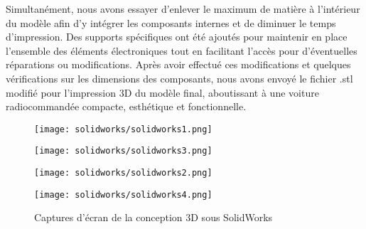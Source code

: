 Simultanément, nous avons essayer d'enlever le maximum de matière à l'intérieur du modèle afin d'y intégrer les composants internes et de diminuer le temps d'impression. Des supports spécifiques ont été ajoutés pour maintenir en place l'ensemble des éléments électroniques tout en facilitant l'accès pour d'éventuelles réparations ou modifications.
\newpage
Après avoir effectué ces modifications et quelques vérifications sur les dimensions des composants, nous avons envoyé le fichier .stl modifié pour l'impression 3D du modèle final, aboutissant à une voiture radiocommandée compacte, esthétique et fonctionnelle.
\bigbreak
\begin{figure}[h]
    \begin{minipage}[c]{.46\linewidth}
        \centering
        \texttt{[image: solidworks/solidworks1.png]}
    	\label{fig:Vue principale conception 3D}
    \end{minipage}
    \hfill%
    \begin{minipage}[c]{.46\linewidth}
        \centering
        \texttt{[image: solidworks/solidworks3.png]}
    	\label{fig:Vue de côté conception 3D}
    \end{minipage}
    \begin{minipage}[c]{.46\linewidth}
        \centering
        \texttt{[image: solidworks/solidworks2.png]}
    	\label{fig:Vue du dessous 2 conception 3D}
    \end{minipage}
    \hfill%
    \begin{minipage}[c]{.46\linewidth}
        \centering
       	\texttt{[image: solidworks/solidworks4.png]}
    	\label{fig:Vue du dessous conception 3D}
    \end{minipage}
    \caption{Captures d'écran de la conception 3D sous SolidWorks}
\end{figure}

\newpage